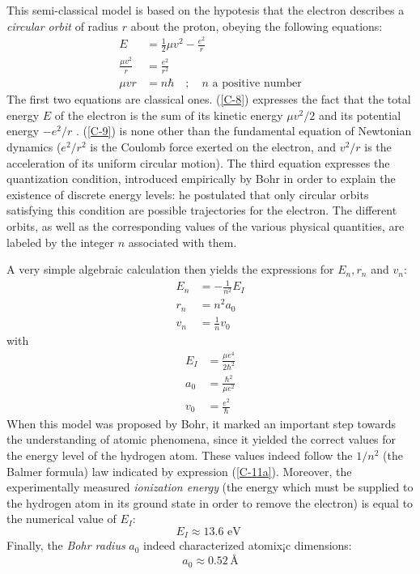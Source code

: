 This semi-classical model is based on the hypotesis that the electron describes a \textit{circular orbit} of radius $r$ about the proton, obeying the following equations:
\begin{align}
	\label{C-8}E&=\frac{1}{2}\mu v^2-\frac{e^2}{r}\\
	\label{C-9}\frac{\mu v^2}{r}&=\frac{e^2}{r^2}\\
	\mu  v r&=n\hbar\quad ; \quad \mbox{$n$ a positive number}\label{C-10}
\end{align}
The first two equations are classical ones. (\ref{C-8}) expresses the fact that the total energy $E$ of the electron is the sum of its kinetic energy $\mu v^2/2$  and its potential energy $-e^2/r$ . (\ref{C-9}) is none other than the fundamental equation of Newtonian dynamics ($e^2/r^2$ is the Coulomb force exerted on the electron, and $v^2/r$ is the acceleration of its uniform circular motion). The third equation expresses the quantization condition, introduced empirically by Bohr in order to explain the existence of discrete energy levels: he postulated that only circular orbits satisfying this condition are possible trajectories for the electron. The different orbits, as well as the corresponding values of the various physical quantities, are labeled by the integer $n$ associated with them.

A very simple algebraic calculation then yields the expressions for $E_n,r_n$ and $v_n$:
\begin{align}
	\label{C_11a}E_n&=-\frac{1}{n^2}E_I\\
	\label{C-11b}r_n&=n^2a_0\\
	v_n&=\frac{1}{n}v_0\label{C-11c}
\end{align}
with 
\begin{align}
	\label{C-12a}E_I&=\frac{\mu e^4}{2\hbar^2}\\
	\label{C-12b}a_0&=\frac{\hbar^2}{\mu e^2}\\
	v_0&=\frac{e^2}{\hbar}\label{C-12c}
\end{align}
When this model was proposed by Bohr, it marked an important step towards the understanding of atomic phenomena, since it yielded the correct values for the energy level of the hydrogen atom. These values indeed follow the $1/n^2$ (the Balmer formula) law indicated by expression (\ref{C-11a}). Moreover, the experimentally measured \textit{ionization energy} (the energy which must be supplied to the hydrogen atom in its ground state in order to remove the electron) is equal to the numerical value of $E_I$:
\begin{equation}\label{C-13}
	E_I\approx 13.6 \mbox{ eV }
\end{equation}
Finally, the \textit{Bohr radius} $a_0$ indeed characterized atomix¡c dimensions:
\begin{equation}\label{C-14}
	a_0\approx 0.52  \,\si{\angstrom}
\end{equation}

